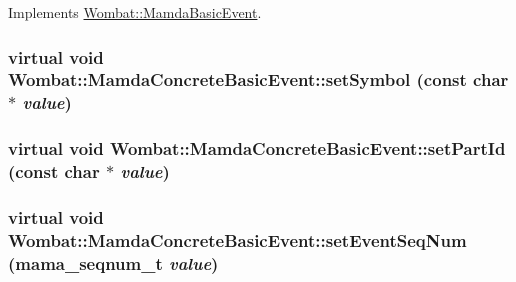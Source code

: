 Implements \hyperlink{classWombat_1_1MamdaBasicEvent_3454d51e1131d9949691ee4b4153cd97}{Wombat::Mamda\-Basic\-Event}.\hypertarget{classWombat_1_1MamdaConcreteBasicEvent_4946f2e20b0d6488b86df43cf101d4db}{
\subsubsection[setSymbol]{\setlength{\rightskip}{0pt plus 5cm}virtual void Wombat::Mamda\-Concrete\-Basic\-Event::set\-Symbol (const char $\ast$ {\em value})}}
\label{classWombat_1_1MamdaConcreteBasicEvent_4946f2e20b0d6488b86df43cf101d4db}


\hypertarget{classWombat_1_1MamdaConcreteBasicEvent_e3951ca746cdd579a1cf1edba982b3a2}{
\subsubsection[setPartId]{\setlength{\rightskip}{0pt plus 5cm}virtual void Wombat::Mamda\-Concrete\-Basic\-Event::set\-Part\-Id (const char $\ast$ {\em value})}}
\label{classWombat_1_1MamdaConcreteBasicEvent_e3951ca746cdd579a1cf1edba982b3a2}


\hypertarget{classWombat_1_1MamdaConcreteBasicEvent_76b006c8778ba8b6da906017dab2bde1}{
\subsubsection[setEventSeqNum]{\setlength{\rightskip}{0pt plus 5cm}virtual void Wombat::Mamda\-Concrete\-Basic\-Event::set\-Event\-Seq\-Num (mama\_\-seqnum\_\-t {\em value})}}
\label{classWombat_1_1MamdaConcreteBasicEvent_76b006c8778ba8b6da906017dab2bde1}


